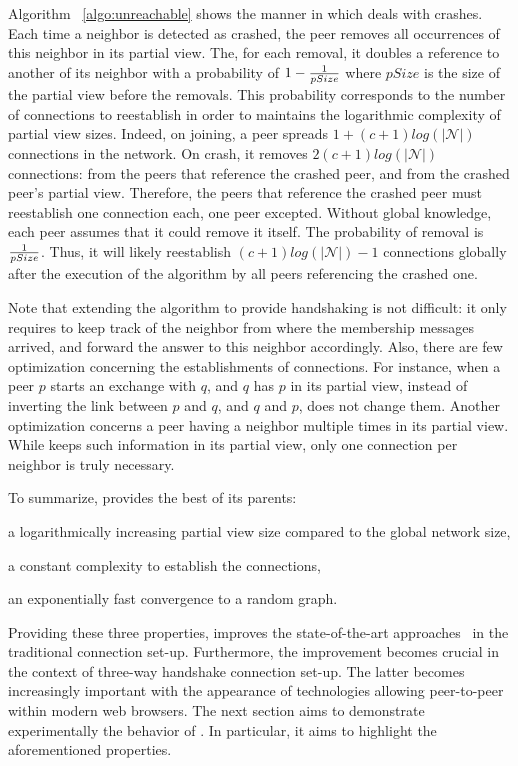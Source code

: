 \begin{asparadesc}
\item [Algorithm]~\ref{algo:unreachable} shows the manner in which \SCAMPLON{}
  deals with crashes. Each time a neighbor is detected as crashed, the peer
  removes all occurrences of this neighbor in its partial view. The, for each
  removal, it doubles a reference to another of its neighbor with a probability
  of $1-{1\over{pSize}}$ where $pSize$ is the size of the partial view before
  the removals. This probability corresponds to the number of connections to
  reestablish in order to maintains the logarithmic complexity of partial view
  sizes. Indeed, on joining, a peer spreads $1+(c+1)log(|\mathcal{N}|)$
  connections in the network. On crash, it removes $2(c+1)log(|\mathcal{N}|)$
  connections: from the peers that reference the crashed peer, and from the
  crashed peer's partial view. Therefore, the peers that reference the crashed
  peer must reestablish one connection each, one peer excepted. Without global
  knowledge, each peer assumes that it could remove it itself. The probability
  of removal is ${1\over{pSize}}$. Thus, it will likely reestablish
  $(c+1)log(|\mathcal{N}|)-1$ connections globally after the execution of the
  algorithm by all peers referencing the crashed one.
\end{asparadesc}


Note that extending the algorithm to provide handshaking is not difficult: it
only requires to keep track of the neighbor from where the membership messages
arrived, and forward the answer to this neighbor accordingly. Also, there are
few optimization concerning the establishments of connections. For instance,
when a peer $p$ starts an exchange with $q$, and $q$ has $p$ in its partial
view, instead of inverting the link between $p$ and $q$, and $q$ and $p$,
\SCAMPLON{} does not change them. Another optimization concerns a peer having a
neighbor multiple times in its partial view. While \SCAMPLON{} keeps such
information in its partial view, only one connection per neighbor is truly
necessary.



To summarize, \SCAMPLON{} provides the best of its parents:
\begin{inparaenum}[(i)]
\item a logarithmically increasing partial view size compared to the global
  network size,
\item a constant complexity to establish the connections,
\item an exponentially fast convergence to a random graph.
\end{inparaenum}
Providing these three properties, \SCAMPLON{} improves the state-of-the-art
approaches~\cite{ganesh2001scamp,voulgaris2005cyclon} in the traditional
connection set-up. Furthermore, the improvement becomes crucial in the context
of three-way handshake connection set-up.  The latter becomes increasingly
important with the appearance of technologies allowing peer-to-peer within
modern web browsers.  The next section aims to demonstrate experimentally the
behavior of \SCAMPLON{}. In particular, it aims to highlight the aforementioned
properties.


